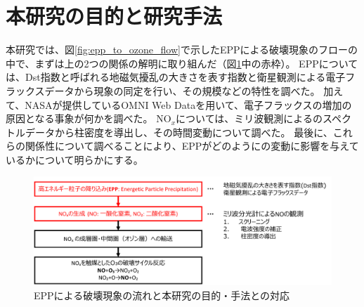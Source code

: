 \section{本研究の目的と研究手法}
\label{sec:intro_porpose}
本研究では、図\ref{fig:epp_to_ozone_flow}で示したEPPによる破壊現象のフローの中で、まずは上の2つの関係の解明に取り組んだ（図\ref{fig:flow_and_porpose}中の赤枠）。
EPPについては、Dst指数と呼ばれる地磁気擾乱の大きさを表す指数と衛星観測による電子フラックスデータから現象の同定を行い、その規模などの特性を調べた。
加えて、NASAが提供しているOMNI Web Dataを用いて、電子フラックスの増加の原因となる事象が何かを調べた。
$\mathrm{NO}_x$については、ミリ波観測によるのスペクトルデータから柱密度を導出し、その時間変動について調べた。
最後に、これらの関係性について調べることにより、EPPがどのようにの変動に影響を与えているかについて明らかにする。
\begin{figure}[htbp]
    \centering
    \includegraphics[width=\linewidth]{master_thesis_contents/master_thesis_fig/flow_and_porpose.pdf}
    \caption{EPPによる破壊現象の流れと本研究の目的・手法との対応}
    \label{fig:flow_and_porpose}
\end{figure}
